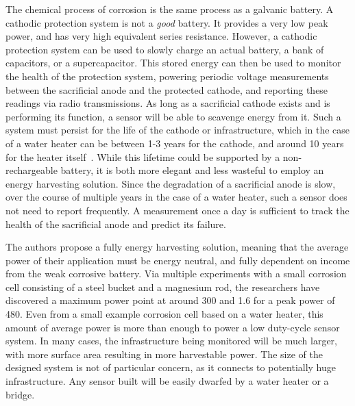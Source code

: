 The chemical process of corrosion is the same process as a galvanic battery.
A cathodic protection system is not a \textit{good} battery.
It provides a very low peak power, and has very high equivalent series resistance.
However, a cathodic protection system can be used to slowly charge an actual battery, a bank of capacitors, or a supercapacitor.
This stored energy can then be used to monitor the health of the protection system, powering periodic voltage measurements between the sacrificial anode and the protected cathode, and reporting these readings via radio transmissions.
As long as a sacrificial cathode exists and is performing its function, a sensor will be able to scavenge energy from it.
Such a system must persist for the life of the cathode or infrastructure, which in the case of a water heater can be between 1-3 years for the cathode, and around 10 years for the heater itself~\cite{jagtap2021repurposing}.
While this lifetime could be supported by a non-rechargeable battery, it is both more elegant and less wasteful to employ an energy harvesting solution.
Since the degradation of a sacrificial anode is slow, over the course of multiple years in the case of a water heater, such a sensor does not need to report frequently.
A measurement once a day is sufficient to track the health of the sacrificial anode and predict its failure.

The authors propose a fully energy harvesting solution, meaning that the average power of their application must be energy neutral, and fully dependent on income from the weak corrosive battery.
Via multiple experiments with a small corrosion cell consisting of a steel bucket and a magnesium rod, the researchers have discovered a maximum power point at around 300\ssi{\milli\volt} and 1.6\ssi{\milli\ampere} for a peak power of 480\ssi{\micro\watt}.
Even from a small example corrosion cell based on a water heater, this amount of average power is more than enough to power a low duty-cycle sensor system.
In many cases, the infrastructure being monitored will be much larger, with more surface area resulting in more harvestable power.
The size of the designed system is not of particular concern, as it connects to potentially huge infrastructure.
Any sensor built will be easily dwarfed by a water heater or a bridge.

